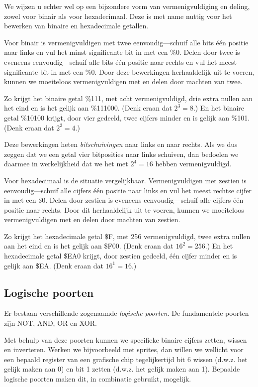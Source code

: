 We wijzen u echter wel op een bijzondere vorm van vermenigvuldiging en deling, zowel voor binair als voor hexadecimaal. Deze is met name nuttig voor het bewerken van binaire en hexadecimale getallen.

Voor binair is vermenigvuldigen met twee eenvoudig---schuif alle bits één positie naar links en vul het minst significante bit in met een \%0. Delen door twee is eveneens eenvoudig---schuif alle bits één positie naar rechts en vul het meest significante bit in met een \%0. Door deze bewerkingen herhaaldelijk uit te voeren, kunnen we moeiteloos vermenigvuldigen met en delen door machten van twee.

Zo krijgt het binaire getal \%111, met acht vermenigvuldigd, drie extra nullen aan het eind en is het gelijk aan \%111000. (Denk eraan dat $2^{3} = 8$.) En het binaire getal \%10100 krijgt, door vier gedeeld, twee cijfers minder en is gelijk aan \%101. (Denk eraan dat $2^{2} = 4$.)

Deze bewerkingen heten {\it bitschuivingen} naar links en naar rechts. Als we dus zeggen dat we een getal vier bitposities naar links schuiven, dan bedoelen we daarmee in werkelijkheid dat we het met $2^{4} = 16$ hebben vermenigvuldigd.

Voor hexadecimaal is de situatie vergelijkbaar. Vermenigvuldigen met zestien is eenvoudig---schuif alle cijfers één positie naar links en vul het meest rechtse cijfer in met een \$0. Delen door zestien is eveneens eenvoudig---schuif alle cijfers één positie naar rechts. Door dit herhaaldelijk uit te voeren, kunnen we moeiteloos vermenigvuldigen met en delen door machten van zestien.

Zo krijgt het hexadecimale getal \$F, met 256 vermenigvuldigd, twee extra nullen aan het eind en is het gelijk aan \$F00. (Denk eraan dat $16^{2} = 256$.) En het hexadecimale getal \$EA0 krijgt, door zestien gedeeld, één cijfer minder en is gelijk aan \$EA. (Denk eraan dat $16^{1} = 16$.)

\subsection{Logische poorten}

Er bestaan verschillende zogenaamde {\it logische poorten}. De fundamentele poorten zijn NOT, AND, OR en XOR.

Met behulp van deze poorten kunnen we specifieke binaire cijfers zetten, wissen en inverteren. Werken we bijvoorbeeld met sprites, dan willen we wellicht voor een bepaald register van een grafische chip tegelijkertijd bit 6 wissen (d.w.z. het gelijk maken aan 0) en bit 1 zetten (d.w.z. het gelijk maken aan 1). Bepaalde logische poorten maken dit, in combinatie gebruikt, mogelijk.

